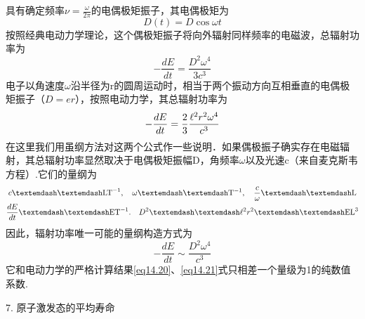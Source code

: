 具有确定频率$\nu=\frac{\omega}{2\pi}$的电偶极矩振子，其电偶极矩为
\begin{equation}\label{eq14.19}
	D(t)=D\cos\omega t
\end{equation}
按照经典电动力学理论，这个偶极矩振子将向外辐射同样频率的电磁波，总辐射功率为
\begin{equation}\label{eq14.20}
	-\frac{dE}{dt}=\frac{D^{2}\omega^{4}}{3c^{3}}
\end{equation}
电子以角速度$\omega$沿半径为r的圆周运动时，相当于两个振动方向互相垂直的电偶极矩振子（$D = er$），按照电动力学，其总辐射功率为
\begin{equation}\label{eq14.21}
	-\frac{dE}{dt}=\frac{2}{3}\frac{\ell^{2}r^{2}\omega^{4}}{c^{3}}
\end{equation}\eqnormal
在这里我们用虽纲方法对这两个公式作一些说明．如果偶极振子确实存在电磁辐射，其总辐射功率显然取决于电偶极矩振幅D，角频率$\omega$以及光速c（来自麦克斯韦方程）.它们的量纲为
\begin{gather} 
	c—— \si{LT^{-1}},\quad \omega—— \si{T^{-1}},\quad \frac{c}{\omega}—— \si{L} \notag\\
	\frac{dE}{dt}—— \si{ET^{-1}}.\quad D^{2}—— \e^{2}r^{2}—— \si{EL^{3}} \notag
\end{gather}\eqshort
因此，辐射功率唯一可能的量纲构造方式为
\begin{equation}\label{eq14.22}
	-\frac{dE}{dt}\sim\frac{D^{2}\omega^{4}}{c^{3}}
\end{equation}\eqnormal
它和电动力学的严格计算结果\eqref{eq14.20}、\eqref{eq14.21}式只相差一个量级为1的纯数值系数.

\textsf{7. 原子激发态的平均寿命}

